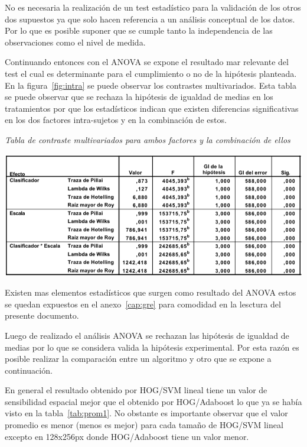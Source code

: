 No es necesaria la realización de un test estadístico para la validación de los otros dos supuestos ya que solo hacen referencia a un análisis conceptual de los datos. Por lo que es posible suponer que se cumple tanto la independencia de las observaciones como el nivel de medida.

Continuando entonces con el ANOVA se expone el resultado mar relevante del test el cual es determinante para el cumplimiento o no de la hipótesis planteada. En la figura~\ref{fig:intra} se puede observar los contrastes multivariados. Esta tabla se puede observar que se rechaza la hipótesis de  igualdad de medias en los tratamientos por que los estadísticos indican que existen diferencias significativas en los dos factores intra-sujetos y en la combinación de estos.

\begin{table}[htc]
  \centering
  \caption{\em Tabla de contraste multivariados para ambos factores y la combinación de ellos}  
  \label{fig:intra}
  \includegraphics[scale=.4]{images/multi}
\end{table}

Existen mas elementos estadísticos que surgen como resultado del ANOVA estos se quedan expuestos en el anexo~\ref{cap:gre} para comodidad en la lesctura del presente documento.


Luego de realizado el análisis ANOVA se rechazan las hipótesis de igualdad de medias por lo que se considera valida la hipótesis experimental. Por esta razón es posible realizar la comparación entre un algoritmo y otro que se expone a continuación.

En general el resultado obtenido por HOG/SVM lineal tiene un valor de sensibilidad espacial mejor que el obtenido por HOG/Adaboost lo que ya se había visto en la tabla~\ref{tab:prom1}. No obstante es importante observar que el valor promedio es menor (menos es mejor) para  cada tamaño de HOG/SVM lineal excepto en 128x256px donde HOG/Adaboost tiene un valor menor. 

